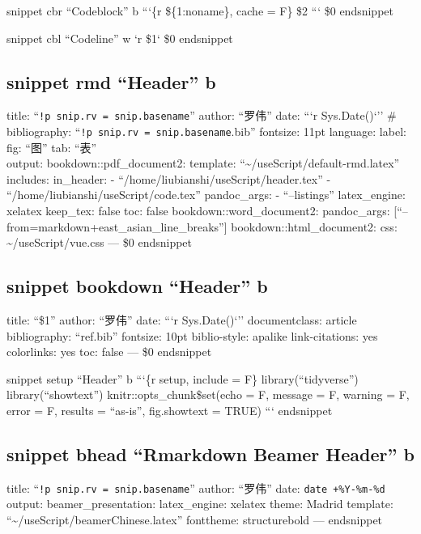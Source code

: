 \documentclass[]{article}
\title{}
\author{}
\date{}
\begin{document}
{
\setcounter{tocdepth}{2}
\tableofcontents
}
snippet cbr ``Codeblock'' b
```\{r \$\{1:noname\}, cache = F\}
\$2
```
\$0
endsnippet

snippet cbl ``Codeline'' w
`r \$1`
\$0
endsnippet

\hypertarget{snippet-rmd-header-b}{%
\subsection{snippet rmd ``Header'' b}\label{snippet-rmd-header-b}}

title: ``\texttt{!p\ snip.rv\ =\ snip.basename}''
author: ``罗伟''
date: ```r Sys.Date()`''
\# bibliography: ``\texttt{!p\ snip.rv\ =\ snip.basename}.bib''
fontsize: 11pt
language:
label:
fig: ``图''
tab: ``表''\\
output:
bookdown::pdf\_document2:
template: ``\textasciitilde/useScript/default-rmd.latex''
includes:
in\_header:
- ``/home/liubianshi/useScript/header.tex''
- ``/home/liubianshi/useScript/code.tex''
pandoc\_args:
- ``--listings''
latex\_engine: xelatex
keep\_tex: false
toc: false
bookdown::word\_document2:
pandoc\_args: {[}``--from=markdown+east\_asian\_line\_breaks''{]}
bookdown::html\_document2:
css: \textasciitilde/useScript/vue.css
---
\$0
endsnippet

\hypertarget{snippet-bookdown-header-b}{%
\subsection{snippet bookdown ``Header'' b}\label{snippet-bookdown-header-b}}

title: ``\$1''
author: ``罗伟''
date: ```r Sys.Date()`''
documentclass: article
bibliography: ``ref.bib''
fontsize: 10pt
biblio-style: apalike
link-citations: yes
colorlinks: yes
toc: false
---
\$0
endsnippet

snippet setup ``Header'' b
```\{r setup, include = F\}
library(``tidyverse'')
library(``showtext'')
knitr::opts\_chunk\$set(echo = F, message = F, warning = F, error = F,
results = ``as-is'', fig.showtext = TRUE)
```
endsnippet

\hypertarget{snippet-bhead-rmarkdown-beamer-header-b}{%
\subsection{snippet bhead ``Rmarkdown Beamer Header'' b}\label{snippet-bhead-rmarkdown-beamer-header-b}}

title: ``\texttt{!p\ snip.rv\ =\ snip.basename}''
author: ``罗伟''
date: \texttt{date\ +\%Y-\%m-\%d}
output:
beamer\_presentation:
latex\_engine: xelatex
theme: Madrid
template: ``\textasciitilde/useScript/beamerChinese.latex''
fonttheme: structurebold
---
endsnippet
\end{document}
